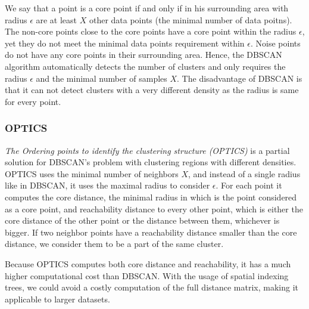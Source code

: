 We say that a point is a core point if and only if in his surrounding area with radius $\epsilon$ are at least $X$ other data points (the minimal number of data poitns). The non-core points close to the core points have a core point within the radius $\epsilon$, yet they do not meet the minimal data points requirement within $\epsilon$. Noise points do not have any core points in their surrounding area. Hence, the DBSCAN algorithm automatically detects the number of clusters and only requires the radius $\epsilon$ and the minimal number of samples $X$. The disadvantage of DBSCAN is that it can not detect clusters with a very different density as the radius is same for every point.

\subsubsection{OPTICS}
\textit{The Ordering points to identify the clustering structure (OPTICS)} \cite{vis:optics} is a partial solution for DBSCAN's problem with clustering regions with different densities. OPTICS uses the minimal number of neighbors $X$, and instead of a single radius like in DBSCAN, it uses the maximal radius to consider $\epsilon$. For each point it computes the core distance, the minimal radius in which is the point considered as a core point, and reachability distance to every other point, which is either the core distance of the other point or the distance between them, whichever is bigger. If two neighbor points have a reachability distance smaller than the core distance, we consider them to be a part of the same cluster.

Because OPTICS computes both core distance and reachability, it has a much higher computational cost than DBSCAN. With the usage of spatial indexing trees, we could avoid a costly computation of the full distance matrix, making it applicable to larger datasets.

